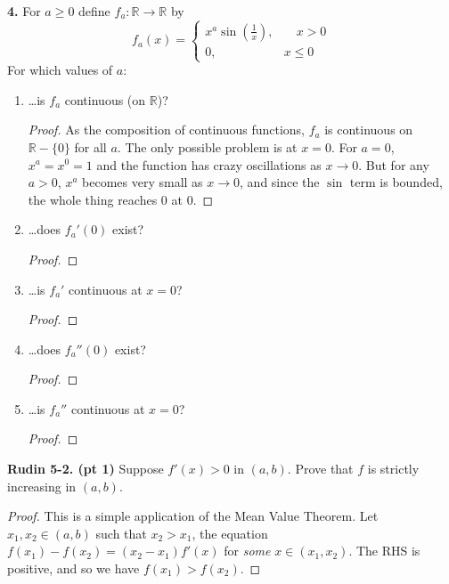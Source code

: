 \documentclass{article}
\newcommand{\R}{\mathbb{R}}
\newcommand{\paren}[1]{\left( #1 \right)}
\newcommand{\problem}[1]{\noindent \textbf{#1}}
\begin{document}
\problem{4. }
For $a \ge 0$ define $f_a : \R \to \R$ by
$$f_a(x) = \begin{cases}
    x^a \sin\paren{\frac{1}{x}}, & \quad x > 0 \\
    0, & x \le 0
\end{cases}$$
For which values of $a$:
\begin{enumerate}
    \item \dots is $f_a$ continuous (on $\R$)?
    \begin{proof}
        As the composition of continuous functions, $f_a$ is continuous on $\R - \{0\}$ for all $a$. The only possible problem is at $x = 0$. For $a = 0$, $x^a = x^0 = 1$ and the function has crazy oscillations as $x \to 0$. But for any $a > 0$, $x^a$ becomes very small as $x \to 0$, and since the $\sin$ term is bounded, the whole thing reaches $0$ at $0$.        
    \end{proof}
    
    \item \dots does $f_a'(0)$ exist?
    \begin{proof}
        
    \end{proof}

    \item \dots is $f_a'$ continuous at $x = 0$?
    \begin{proof}
        
    \end{proof}

    \item \dots does $f_a''(0)$ exist?
    \begin{proof}
        
    \end{proof}

    \item \dots is $f_a''$ continuous at $x = 0$? 
    \begin{proof}
        
    \end{proof}

\end{enumerate}


\problem{Rudin 5-2. (pt 1)}
Suppose $f'(x) > 0$ in $(a, b)$. Prove that $f$ is strictly increasing in $(a, b)$.
\begin{proof}
    This is a simple application of the Mean Value Theorem. Let $x_1, x_2 \in (a, b)$ such that $x_2 > x_1$, the equation $f(x_1) - f(x_2) = (x_2 - x_1) f'(x)$ for \textit{some} $x \in (x_1, x_2)$. The RHS is positive, and so we have $f(x_1) > f(x_2)$.    
\end{proof}
\end{document}
